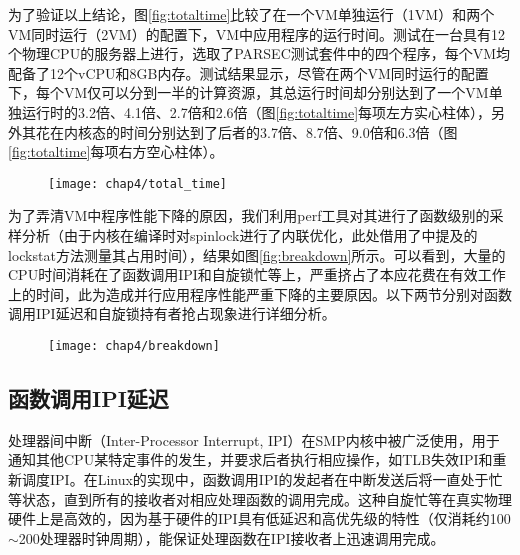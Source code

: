 为了验证以上结论，图\ref{fig:totaltime}比较了在一个VM单独运行（1VM）和两个VM同时运行（2VM）的配置下，VM中应用程序的运行时间。测试在一台具有12个物理CPU的服务器上进行，选取了PARSEC\cite{bienia2008parsec}测试套件中的四个程序，每个VM均配备了12个vCPU和8GB内存。测试结果显示，尽管在两个VM同时运行的配置下，每个VM仅可以分到一半的计算资源，其总运行时间却分别达到了一个VM单独运行时的3.2倍、4.1倍、2.7倍和2.6倍（图\ref{fig:totaltime}每项左方实心柱体），另外其花在内核态的时间分别达到了后者的3.7倍、8.7倍、9.0倍和6.3倍（图\ref{fig:totaltime}每项右方空心柱体）。

\begin{figure}[!htbp]
  \centering
  \texttt{[image: chap4/total\_time]}
\end{figure}

为了弄清VM中程序性能下降的原因，我们利用perf\cite{perf}工具对其进行了函数级别的采样分析（由于内核在编译时对spinlock进行了内联优化，此处借用了\cite{lockstat}中提及的lockstat方法测量其占用时间），结果如图\ref{fig:breakdown}所示。可以看到，大量的CPU时间消耗在了函数调用IPI和自旋锁忙等上，严重挤占了本应花费在有效工作上的时间，此为造成并行应用程序性能严重下降的主要原因。以下两节分别对函数调用IPI延迟和自旋锁持有者抢占现象进行详细分析。

\begin{figure}[!htbp]
  \centering
  \texttt{[image: chap4/breakdown]}
\end{figure}

\subsection{函数调用IPI延迟}

处理器间中断（Inter-Processor Interrupt, IPI）在SMP内核中被广泛使用，用于通知其他CPU某特定事件的发生，并要求后者执行相应操作，如TLB失效IPI和重新调度IPI\cite{hammalund2003inter}。在Linux的实现中，函数调用IPI的发起者在中断发送后将一直处于忙等状态，直到所有的接收者对相应处理函数的调用完成\cite{linux}。这种自旋忙等在真实物理硬件上是高效的，因为基于硬件的IPI具有低延迟和高优先级的特性（仅消耗约100$\sim$200处理器时钟周期）\cite{liu2014scalable}，能保证处理函数在IPI接收者上迅速调用完成。

